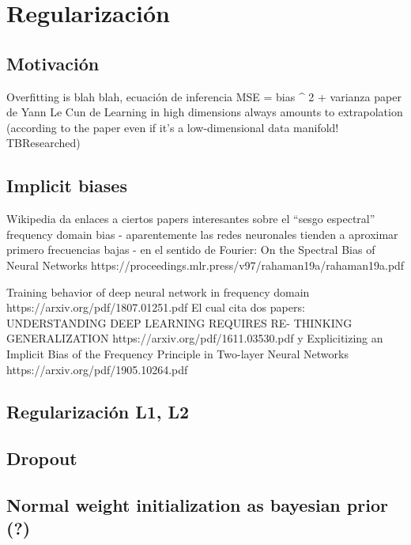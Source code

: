 \hypertarget{regularizaciuxf3n}{%
\section{Regularización}\label{regularizaciuxf3n}}

\hypertarget{motivaciuxf3n}{%
\subsection{Motivación}\label{motivaciuxf3n}}

Overfitting is blah blah, ecuación de inferencia MSE = bias \^{} 2 +
varianza paper de Yann Le Cun de Learning in high dimensions always
amounts to extrapolation (according to the paper even if it's a
low-dimensional data manifold! TBResearched)

\hypertarget{implicit-biases}{%
\subsection{Implicit biases}\label{implicit-biases}}

Wikipedia da enlaces a ciertos papers interesantes sobre el ``sesgo
espectral'' frequency domain bias - aparentemente las redes neuronales
tienden a aproximar primero frecuencias bajas - en el sentido de
Fourier: On the Spectral Bias of Neural Networks
https://proceedings.mlr.press/v97/rahaman19a/rahaman19a.pdf

Training behavior of deep neural network in frequency domain
https://arxiv.org/pdf/1807.01251.pdf El cual cita dos papers:
UNDERSTANDING DEEP LEARNING REQUIRES RE- THINKING GENERALIZATION
https://arxiv.org/pdf/1611.03530.pdf y Explicitizing an Implicit Bias of
the Frequency Principle in Two-layer Neural Networks
https://arxiv.org/pdf/1905.10264.pdf

\hypertarget{regularizaciuxf3n-l1-l2}{%
\subsection{Regularización L1, L2}\label{regularizaciuxf3n-l1-l2}}

\hypertarget{dropout}{%
\subsection{Dropout}\label{dropout}}

\hypertarget{normal-weight-initialization-as-bayesian-prior}{%
\subsection{Normal weight initialization as bayesian prior
(?)}\label{normal-weight-initialization-as-bayesian-prior}}

